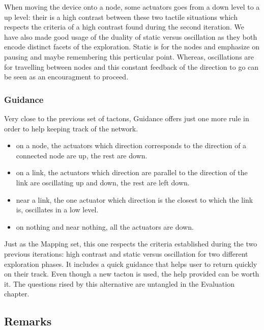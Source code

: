 When moving the device onto a node, some actuators goes from a down
level to a up level: their is a high contrast between these two tactile
situations which respects the criteria of a high contrast found during
the second iteration. We have also made good usage of the duality of
static versus oscillation as they both encode distinct facets of the
exploration. Static is for the nodes and emphasize on pausing and maybe
remembering this perticular point. Whereas, oscillations are for
travelling between nodes and this constant feedback of the direction to
go can be seen as an encouragment to proceed.

\subsubsection{Guidance}\label{guidance}

Very close to the previous set of tactons, Guidance offers just one more
rule in order to help keeping track of the network.

\begin{itemize}
\item
  on a node, the actuators which direction corresponds to the direction
  of a connected node are up, the rest are down.
\item
  on a link, the actuators which direction are parallel to the direction
  of the link are oscillating up and down, the rest are left down.
\item
  near a link, the one actuator which direction is the closest to which
  the link is, oscillates in a low level.
\item
  on nothing and near nothing, all the actuators are down.
\end{itemize}

Just as the Mapping set, this one respects the criteria established
during the two previous iterations: high contrast and static versus
oscillation for two different exploration phases. It includes a quick
guidance that helps user to return quickly on their track. Even though a
new tacton is used, the help provided can be worth it. The questions
rised by this alternative are untangled in the Evaluation chapter.

\subsection{Remarks}\label{remarks}

